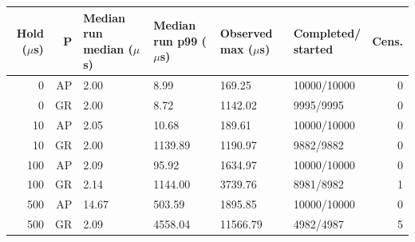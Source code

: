\begin{tabular}{@{}rrllllr@{}}
\toprule
\shortstack{Hold\\($\mu$s)} & P & \shortstack{Median run\\median ($\mu$s)} & \shortstack{Median run\\p99 ($\mu$s)} & \shortstack{Observed\\max ($\mu$s)} & \shortstack{Completed/\\started} & Cens. \\
\midrule
0 & AP & 2.00 & 8.99 & 169.25 & 10000/10000 & 0 \\
0 & GR & 2.00 & 8.72 & 1142.02 & 9995/9995 & 0 \\
10 & AP & 2.05 & 10.68 & 189.61 & 10000/10000 & 0 \\
10 & GR & 2.00 & 1139.89 & 1190.97 & 9882/9882 & 0 \\
100 & AP & 2.09 & 95.92 & 1634.97 & 10000/10000 & 0 \\
100 & GR & 2.14 & 1144.00 & 3739.76 & 8981/8982 & 1 \\
500 & AP & 14.67 & 503.59 & 1895.85 & 10000/10000 & 0 \\
500 & GR & 2.09 & 4558.04 & 11566.79 & 4982/4987 & 5 \\
\bottomrule
\end{tabular}
